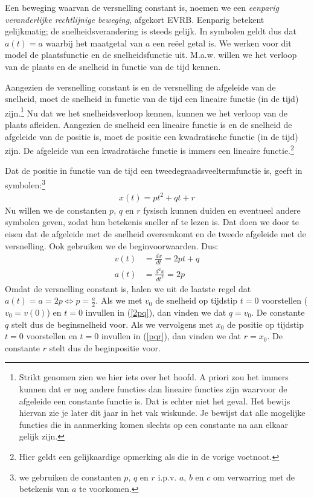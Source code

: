 \documentclass{ximera}
\begin{document}
	\author{Bart Lambregs}
    \xmsource




	Een beweging waarvan de versnelling constant is, noemen we een \textit{eenparig veranderlijke rechtlijnige be\-we\-ging}, afgekort EVRB. Eenparig betekent gelijkmatig; de snelheidsverandering is steeds gelijk. In symbolen geldt dus dat $a(t)=a$ waarbij het maatgetal van $a$ een reëel getal is. We werken voor dit model de plaatsfunctie en de snelheidsfunctie uit. M.a.w. willen we het verloop van de plaats en de snelheid in functie van de tijd kennen. 
	
	Aangezien de versnelling constant is en de versnelling de afgeleide van de snelheid, moet de snelheid in functie van de tijd een lineaire functie (in de tijd) zijn.\footnote{Strikt genomen zien we hier iets over het hoofd. A priori zou het immers kunnen dat er nog andere functies dan lineaire functies zijn waarvoor de afgeleide een constante functie is. Dat is echter niet het geval. Het bewijs hiervan zie je later dit jaar in het vak wiskunde. Je bewijst dat alle mogelijke functies die in aanmerking komen slechts op een constante na aan elkaar gelijk zijn.} Nu dat we het snelheidsverloop kennen, kunnen we het verloop van de plaats afleiden. Aangezien de snelheid een lineaire functie is en de snelheid de afgeleide van de positie is, moet de positie een kwadratische functie (in de tijd) zijn. De afgeleide van een kwadratische functie is immers een lineaire functie.\footnote{Hier geldt een gelijkaardige opmerking als die in de vorige voetnoot.}
	
	Dat de positie in functie van de tijd een tweedegraadsveeltermfunctie is, geeft in symbolen:\footnote{we gebruiken de constanten $p$, $q$ en $r$ i.p.v. $a$, $b$ en $c$ om verwarring met de betekenis van $a$ te voorkomen.}
	\begin{eqnarray}
	x(t)=pt^2+qt+r
	\end{eqnarray}
	Nu willen we de constanten $p$, $q$ en $r$ fysisch kunnen duiden en eventueel andere symbolen geven, zodat hun betekenis sneller af te lezen is. Dat doen we door te eisen dat de afgeleide met de snelheid overeenkomt en de tweede afgeleide met de versnelling. Ook gebruiken we de beginvoorwaarden. Dus:
	\begin{align}
	v(t)&=\frac{dx}{dt}=2pt+q\\
	a(t)&=\frac{d^2x}{dt^2}=2p\nonumber
	\end{align}
	Omdat de versnelling constant is, halen we uit de laatste regel dat $a(t)=a=2p\Leftrightarrow p=\frac{a}{2}$. Als we met $v_0$ de snelheid op tijdstip $t=0$ voorstellen ($v_0=v(0)$) en $t=0$ invullen in (\ref{2pq}), dan vinden we dat $q=v_0$. De constante $q$ stelt dus de beginsnelheid voor. Als we vervolgens met $x_0$ de positie op tijdstip $t=0$ voorstellen en $t=0$ invullen in (\ref{pqr}), dan vinden we dat $r=x_0$. De constante $r$ stelt dus de beginpositie voor.
	
\end{document}
